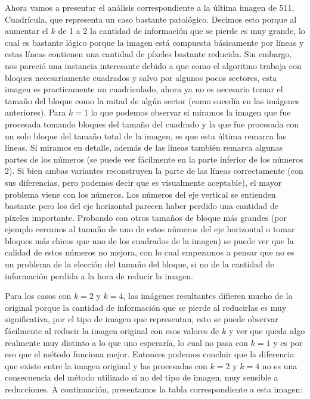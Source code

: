 \documentclass[a4paper]{article}
\begin{document}
Ahora vamos a presentar el análisis correspondiente a la última imagen de 511, Cuadrícula, que representa un caso bastante patológico. Decimos esto porque al aumentar el $k$ de 1 a 2 la cantidad de información que se pierde es muy grande, lo cual es bastante lógico porque la imagen está compuesta básicamente por líneas y estas líneas contienen una cantidad de píxeles bastante reducida. Sin embargo, nos pareció una instancia interesante debido a que como el algoritmo trabaja con bloques necesariamente cuadrados y salvo por algunos pocos sectores, esta imagen es practicamente un cuadriculado, ahora ya no es necesario tomar el tamaño del bloque como la mitad de algún sector (como sucedía en las imágenes anteriores). Para $k = 1$ lo que podemos observar si miramos la imagen que fue procesada tomando bloques del tamaño del cuadrado y la que fue procesada con un solo bloque del tamaño total de la imagen, es que esta última remarca las líneas. Si miramos en detalle, además de las líneas también remarca algunas partes de los números (se puede ver fácilmente en la parte inferior de los números 2). Si bien ambas variantes reconstruyen la parte de las líneas correctamente (con sus diferencias, pero podemos decir que es visualmente aceptable), el mayor problema viene con los números. Los números del eje vertical se entienden bastante pero los del eje horizontal parecen haber perdido una cantidad de píxeles importante. Probando con otros tamaños de bloque más grandes (por ejemplo cercanos al tamaño de uno de estos números del eje horizontal o tomar bloques más chicos que uno de los cuadrados de la imagen) se puede ver que la calidad de estos números no mejora, con lo cual empezamos a pensar que no es un problema de la elección del tamaño del bloque, si no de la cantidad de información perdida a la hora de reducir la imagen.
\par Para los casos con $k = 2$ y $k = 4$, las imágenes resultantes difieren mucho de la original porque la cantidad de información que se pierde al reducirlas es muy significativa, por el tipo de imagen que representan, esto se puede observar fácilmente al reducir la imagen original con esos valores de $k$ y ver que queda algo realmente muy distinto a lo que uno esperaría, lo cual no pasa con $k = 1$ y es por eso que el método funciona mejor. Entonces podemos concluir que la diferencia que existe entre la imagen original y las procesadas con $k = 2$ y $k = 4$ no es una consecuencia del método utilizado si no del tipo de imagen, muy sensible a reducciones.
\newline A continuación, presentamos la tabla correspondiente a esta imagen:
\newline
\end{document}
